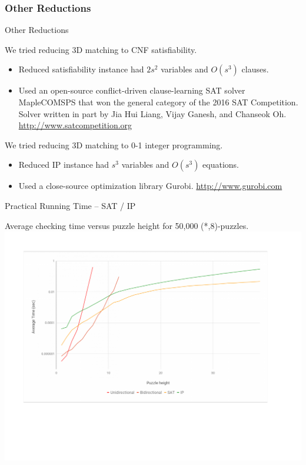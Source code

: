 \documentclass[t,10pt,
mathserif,xcolor=dvipsnames]{beamer}
\begin{document}
\subsubsection{Other Reductions}

\begin{myframe}{Other Reductions}

  We tried reducing 3D matching to CNF satisfiability.
  \begin{itemize}
  \item Reduced satisfiability instance had $2s^2$ variables and
    $O(s^3)$ clauses.
  \item Used an open-source conflict-driven clause-learning SAT solver
    MapleCOMSPS that won the general category of the 2016 SAT
    Competition.  Solver written in part by Jia Hui Liang, Vijay
    Ganesh, and Chanseok Oh.  \\\url{http://www.satcompetition.org}
  \end{itemize}

  \bigskip

  We tried reducing 3D matching to 0-1 integer programming.
  \begin{itemize}
  \item Reduced IP instance had $s^3$ variables and
    $O(s^3)$ equations.
  \item Used a close-source optimization library Gurobi.
    \url{http://www.gurobi.com}
  \end{itemize}
  
\end{myframe}

\begin{myframe}{Practical Running Time -- SAT / IP}

  Average checking time versus puzzle height for 50,000 (*,8)-puzzles.
  \hspace*{-9ex}\includegraphics[width=1.28\linewidth, trim={.5in 2in 1in 1in}, clip]{figs/plotsat.pdf}
 
\end{myframe}
\end{document}
